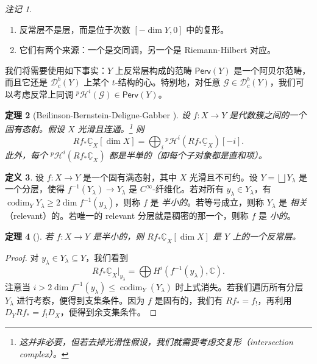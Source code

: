 \documentclass{amsart}
\newtheorem{thm}{定理}[section]
\theoremstyle{definition}
\newtheorem{defn}[thm]{定义}
\theoremstyle{remark}
\newtheorem{rmks}[thm]{注记}
\theoremstyle{plain}
\theoremstyle{definition}
\theoremstyle{remark}
\newcommand{\C}{\mathbb{C}}
\newcommand{\mc}[1]{\mathcal{#1}}
\newcommand{\on}[1]{\operatorname{#1}}
\newcommand{\ms}[1]{\mathsf{#1}}
\newcommand{\ul}[1]{\underline{#1}}
\newcommand{\1}{\mathbf{1}}
\newcommand{\2}{\mathbf{2}}
\newcommand{\3}{\mathbf{3}}
\begin{document}
\begin{rmks}\leavevmode
    \begin{enumerate}
        \item 反常层不是层，而是位于次数 \([-\dim Y, 0]\) 中的复形。
        \item 它们有两个来源：一个是交同调，另一个是 Riemann-Hilbert 对应。
    \end{enumerate}
\end{rmks}

我们将需要使用如下事实：\(Y\) 上反常层构成的范畴 \(\ms{Perv}(Y)\) 是一个阿贝尔范畴，而且它还是 \(\mc{D}_c^b(Y)\) 上某个 \(t\)-结构的心。特别地，对任意 \(\mc{G} \in \mc{D}_c^b (Y)\)，我们可以考虑反常上同调 \(^p\mc{H}^i(\mc{G}) \in \ms{Perv}(Y)\)。

\begin{thm}[Beilinson-Bernstein-Deligne-Gabber {\cite{BBD1982}}]
    设 \(f \colon X \to Y\) 是代数簇之间的一个固有态射。假设 \(X\) 光滑且连通。\footnote{这并非必要，但若去掉光滑性假设，我们就需要考虑交复形（intersection complex）。} 则
    \[ R f_* \ul{\C}_X [\dim X] = \bigoplus_{i} {^p\mc{H}^i}(R f_* \ul{\C}_X)[-i]. \]
    此外，每个 \(^p\mc{H}^i (R f_* \ul{\C}_X)\) 都是半单的（即每个子对象都是直和项）。
\end{thm}

\begin{defn}
    设 \(f \colon X \to Y\) 是一个固有满态射，其中 \(X\) 光滑且不可约。设 \(Y = \bigsqcup Y_{\lambda}\) 是一个分层，使得 \(f^{-1}(Y_{\lambda}) \to Y_{\lambda}\) 是 \(C^{\infty}\)-纤维化。若对所有 \(y_{\lambda} \in Y_{\lambda}\)，有 \(\on{codim}_Y Y_{\lambda} \geq 2 \dim f^{-1} (y_{\lambda})\)，则称 \(f\) 是 \textit{半小的}。若等号成立，则称 \(Y_{\lambda}\) 是 \textit{相关}（relevant）的。若唯一的 relevant 分层就是稠密的那一个，则称 \(f\) 是 \textit{小的}。
\end{defn}

\begin{thm}[{\cite{DeCataldoMigliorini2002}}]
    若 \(f \colon X \to Y\) 是半小的，则 \(R f_* \ul{\C}_X [\dim X]\) 是 \(Y\) 上的一个反常层。
\end{thm}

\begin{proof}
    对 \(y_{\lambda} \in Y_{\lambda} \subseteq Y\)，我们看到
    \[ R f_* \ul{\C}_X |_{y_{\lambda}} = \bigoplus H^i (f^{-1}(y_{\lambda}), \C). \]
    注意当 \(i > 2 \dim f^{-1}(y_{\lambda}) \leq \on{codim}_Y (Y_{\lambda})\) 时上式消失。若我们遍历所有分层 \(Y_{\lambda}\) 进行考察，便得到支集条件。因为 \(f\) 是固有的，我们有 \(R f_* = f_!\)，再利用 \(D_Y R f_* = f_! D_X\)，便得到余支集条件。
\end{proof}
\end{document}

